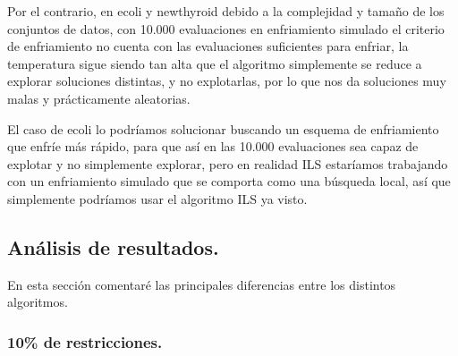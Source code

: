\documentclass[12pt, spanish]{article}
\begin{document}
Por el contrario, en ecoli y newthyroid debido a la complejidad y tamaño de los conjuntos de datos, con 10.000 evaluaciones en enfriamiento simulado el criterio de enfriamiento no cuenta con las evaluaciones suficientes para enfriar, la temperatura sigue siendo tan alta que el algoritmo simplemente se reduce a explorar soluciones distintas, y no explotarlas, por lo que nos da soluciones muy malas y prácticamente aleatorias.

El caso de ecoli lo podríamos solucionar buscando un esquema de enfriamiento que enfríe más rápido, para que así en las 10.000 evaluaciones sea capaz de explotar y no simplemente explorar, pero en realidad ILS estaríamos trabajando con un enfriamiento simulado que se comporta como una búsqueda local, así que simplemente podríamos usar el algoritmo ILS ya visto.


\subsection{Análisis de resultados.	}

En esta sección comentaré las principales diferencias entre los distintos algoritmos.

\subsubsection{10\% de restricciones.}
\end{document}
